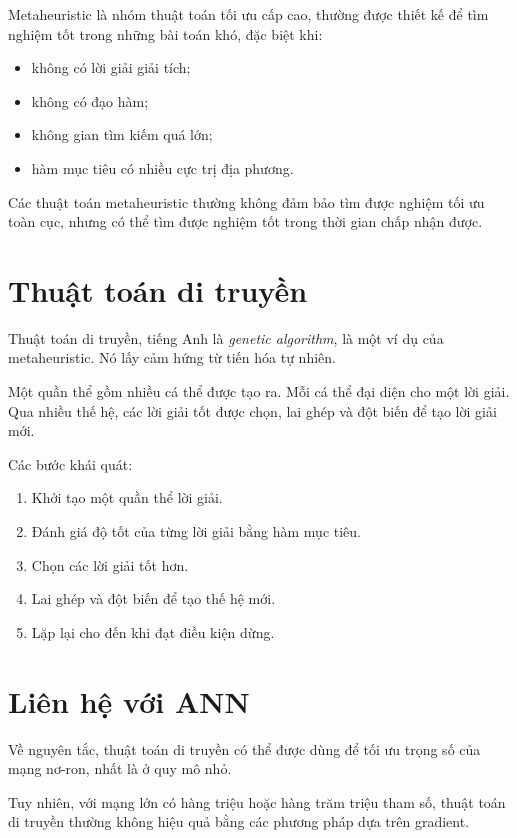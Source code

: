 \documentclass[12pt,a4paper]{report}
\begin{document}
Metaheuristic là nhóm thuật toán tối ưu cấp cao, thường được thiết kế để tìm nghiệm tốt trong những bài toán khó, đặc biệt khi:

\begin{itemize}
    \item không có lời giải giải tích;
    \item không có đạo hàm;
    \item không gian tìm kiếm quá lớn;
    \item hàm mục tiêu có nhiều cực trị địa phương.
\end{itemize}

Các thuật toán metaheuristic thường không đảm bảo tìm được nghiệm tối ưu toàn cục, nhưng có thể tìm được nghiệm tốt trong thời gian chấp nhận được.

\section{Thuật toán di truyền}

Thuật toán di truyền, tiếng Anh là \textit{genetic algorithm}, là một ví dụ của metaheuristic. Nó lấy cảm hứng từ tiến hóa tự nhiên.

Một quần thể gồm nhiều cá thể được tạo ra. Mỗi cá thể đại diện cho một lời giải. Qua nhiều thế hệ, các lời giải tốt được chọn, lai ghép và đột biến để tạo lời giải mới.

Các bước khái quát:

\begin{enumerate}
    \item Khởi tạo một quần thể lời giải.
    \item Đánh giá độ tốt của từng lời giải bằng hàm mục tiêu.
    \item Chọn các lời giải tốt hơn.
    \item Lai ghép và đột biến để tạo thế hệ mới.
    \item Lặp lại cho đến khi đạt điều kiện dừng.
\end{enumerate}

\section{Liên hệ với ANN}

Về nguyên tắc, thuật toán di truyền có thể được dùng để tối ưu trọng số của mạng nơ-ron, nhất là ở quy mô nhỏ.

Tuy nhiên, với mạng lớn có hàng triệu hoặc hàng trăm triệu tham số, thuật toán di truyền thường không hiệu quả bằng các phương pháp dựa trên gradient.
\end{document}
